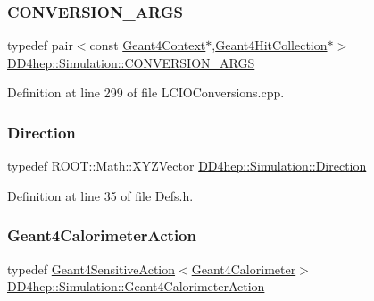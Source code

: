 \subsubsection{\texorpdfstring{C\+O\+N\+V\+E\+R\+S\+I\+O\+N\+\_\+\+A\+R\+GS}{CONVERSION\_ARGS}}
{\footnotesize\ttfamily typedef pair$<$const \hyperlink{class_d_d4hep_1_1_simulation_1_1_geant4_context}{Geant4\+Context}$\ast$,\hyperlink{class_d_d4hep_1_1_simulation_1_1_geant4_hit_collection}{Geant4\+Hit\+Collection}$\ast$$>$ \hyperlink{namespace_d_d4hep_1_1_simulation_a8700b6db44e003d9cf53ec35933063dc}{D\+D4hep\+::\+Simulation\+::\+C\+O\+N\+V\+E\+R\+S\+I\+O\+N\+\_\+\+A\+R\+GS}}



Definition at line 299 of file L\+C\+I\+O\+Conversions.\+cpp.

\hypertarget{namespace_d_d4hep_1_1_simulation_a4b5bfd838293f3222b9d004c7dd1d6b3}{}\label{namespace_d_d4hep_1_1_simulation_a4b5bfd838293f3222b9d004c7dd1d6b3} 
\subsubsection{\texorpdfstring{Direction}{Direction}}
{\footnotesize\ttfamily typedef R\+O\+O\+T\+::\+Math\+::\+X\+Y\+Z\+Vector \hyperlink{namespace_d_d4hep_1_1_geometry_a56730a0ddb9f3f089c415cd693bd7c19}{D\+D4hep\+::\+Simulation\+::\+Direction}}



Definition at line 35 of file Defs.\+h.

\hypertarget{namespace_d_d4hep_1_1_simulation_af49169edf9a8a04f3255a2b126698128}{}\label{namespace_d_d4hep_1_1_simulation_af49169edf9a8a04f3255a2b126698128} 
\subsubsection{\texorpdfstring{Geant4\+Calorimeter\+Action}{Geant4CalorimeterAction}}
{\footnotesize\ttfamily typedef \hyperlink{class_d_d4hep_1_1_simulation_1_1_geant4_sensitive_action}{Geant4\+Sensitive\+Action}$<$\hyperlink{class_d_d4hep_1_1_simulation_1_1_geant4_calorimeter}{Geant4\+Calorimeter}$>$ \hyperlink{namespace_d_d4hep_1_1_simulation_af49169edf9a8a04f3255a2b126698128}{D\+D4hep\+::\+Simulation\+::\+Geant4\+Calorimeter\+Action}}



